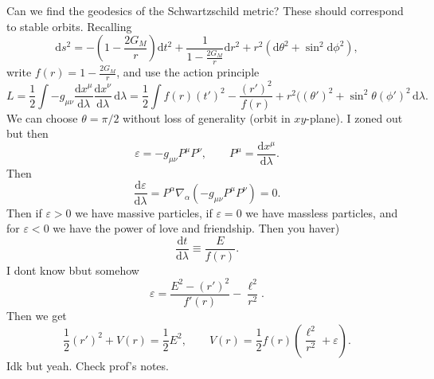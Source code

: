 
Can we find the geodesics of the Schwartzschild metric? These should correspond to stable orbits. Recalling
\[
	\mathrm{d} s^2 = -\left( 1-\frac{2G_M}{r}  \right) \mathrm{d} t^2+\frac{1}{1-\frac{2G_M}{r} } \mathrm{d} r^2+r^2 \left( \mathrm{d} \theta ^2+ \sin ^2 \mathrm{d} \phi ^2 \right) 
,\]
write $f(r)=1-\frac{2G_M}{r} $, and use the action principle
\[
	L=\frac{1}{2} \int -g_{\mu \nu } \frac{\mathrm{d}x^\mu }{\mathrm{d}\lambda } \frac{\mathrm{d}x^\nu }{\mathrm{d}\lambda }  \,\mathrm{d} \lambda =\frac{1}{2} \int f(r)(t')^2-\frac{(r')^2}{f(r)} +r^2((\theta ')^2+\sin ^2\theta (\phi ')^2 \,\mathrm{d} \lambda 
.\]
We can choose $\theta =\pi /2$ without loss of generality (orbit in $xy$-plane). I zoned out but then
\[
	\varepsilon =-g_{\mu \nu } P^\mu P^\nu ,\qquad P^\mu =\frac{\mathrm{d}x^\mu }{\mathrm{d}\lambda } 
.\]
Then
\[
	\frac{\mathrm{d}\varepsilon }{\mathrm{d}\lambda } =P^\alpha \nabla _\alpha \left( -g_{\mu \nu } P^\mu P^\nu  \right) =0
.\]
Then if $\varepsilon >0$ we have massive particles, if $\varepsilon =0$ we have massless particles, and for $\varepsilon <0$ we have the power of love and friendship. Then you haver)
\[
	\frac{\mathrm{d}t}{\mathrm{d}\lambda } \equiv \frac{E}{f(r)} 
.\]
I dont know bbut somehow
\[
	\varepsilon =\frac{E^2-(r')^2}{f'(r)} -\frac{\ell ^2}{r^2} 
.\]
Then we get
\[
	\frac{1}{2} (r')^2+V(r)=\frac{1}{2} E^2,\qquad V(r)=\frac{1}{2} f(r)\left( \frac{\ell ^2}{r^2} +\varepsilon  \right) 
.\]
Idk but yeah. Check prof's notes.
